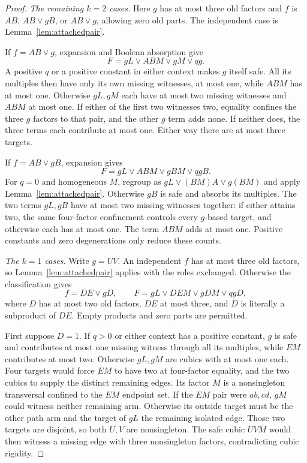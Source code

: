 \documentclass[11pt]{article}
\theoremstyle{definition}
\theoremstyle{remark}
\begin{document}
\begin{proof}
\emph{The remaining $k=2$ cases.}
Here $g$ has at most three old factors and $f$ is $AB$, $AB\vee gB$, or $AB\vee g$, allowing zero old parts. The independent case is Lemma~\ref{lem:attachedpair}.

If $f=AB\vee g$, expansion and Boolean absorption give
\[
 F=gL\vee ABM\vee gM\vee qg.
\]
A positive $q$ or a positive constant in either context makes $g$ itself safe. All its multiples then have only its own missing witnesses, at most one, while $ABM$ has at most one. Otherwise $gL,gM$ each have at most two missing witnesses and $ABM$ at most one. If either of the first two witnesses two, equality confines the three $g$ factors to that pair, and the other $g$ term adds none. If neither does, the three terms each contribute at most one. Either way there are at most three targets.

If $f=AB\vee gB$, expansion gives
\[
 F=gL\vee ABM\vee gBM\vee qgB.
\]
For $q=0$ and homogeneous $M$, regroup as $gL\vee(BM)A\vee g(BM)$ and apply Lemma~\ref{lem:attachedpair}. Otherwise $gB$ is safe and absorbs its multiples. The two terms $gL,gB$ have at most two missing witnesses together: if either attains two, the same four-factor confinement controls every $g$-based target, and otherwise each has at most one. The term $ABM$ adds at most one. Positive constants and zero degenerations only reduce these counts.

\emph{The $k=1$ cases.}
Write $g=UV$. An independent $f$ has at most three old factors, so Lemma~\ref{lem:attachedpair} applies with the roles exchanged. Otherwise the classification gives
\[
 f=DE\vee gD,\qquad
 F=gL\vee DEM\vee gDM\vee qgD,                 \tag{*}
\]
where $D$ has at most two old factors, $DE$ at most three, and $D$ is literally a subproduct of $DE$. Empty products and zero parts are permitted.

First suppose $D=1$. If $q>0$ or either context has a positive constant, $g$ is safe and contributes at most one missing witness through all its multiples, while $EM$ contributes at most two. Otherwise $gL,gM$ are cubics with at most one each. Four targets would force $EM$ to have two at four-factor equality, and the two cubics to supply the distinct remaining edges. Its factor $M$ is a nonsingleton transversal confined to the $EM$ endpoint set. If the $EM$ pair were $ab,cd$, $gM$ could witness neither remaining arm. Otherwise its outside target must be the other path arm and the target of $gL$ the remaining isolated edge. Those two targets are disjoint, so both $U,V$ are nonsingleton. The safe cubic $UVM$ would then witness a missing edge with three nonsingleton factors, contradicting cubic rigidity.


\end{proof}
\end{document}

